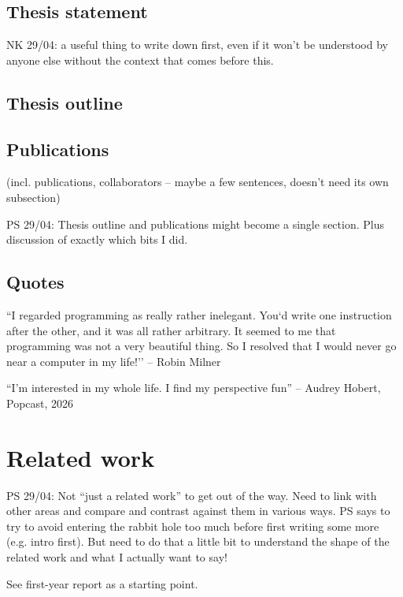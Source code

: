 \documentclass[withindex,glossary]{cam-thesis}
\begin{document}

\section{Thesis statement}

NK 29/04: a useful thing to write down first, even if it won't be understood by anyone else without the context that comes before this.

\section{Thesis outline}
\section{Publications} 
(incl. publications, collaborators -- maybe a few sentences, doesn't need its own subsection)

PS 29/04: Thesis outline and publications might become a single section. Plus discussion of exactly which bits I did.

\section{Quotes}

``I regarded programming as really rather inelegant. You`d write one instruction after the other, and it was all rather arbitrary. It seemed to me that programming was not a very beautiful thing. So I resolved that I would never go near a computer in my life!'' -- Robin Milner

``I'm interested in my whole life. I find my perspective fun'' -- Audrey Hobert, Popcast, 2026


\chapter{Related work}

PS 29/04: Not ``just a related work'' to get out of the way. Need to link with other areas and compare and contrast against them in various ways. PS says to try to avoid entering the rabbit hole too much before first writing some more (e.g. intro first). But need to do that a little bit to understand the shape of the related work and what I actually want to say! 

See first-year report as a starting point.
\end{document}

